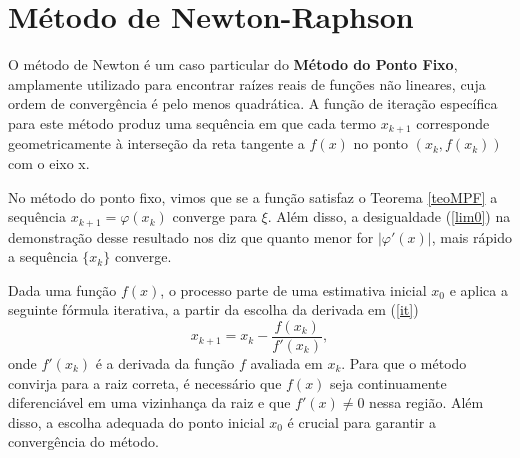 \section{Método de Newton-Raphson}




O método de Newton é um caso particular do \textbf{Método do Ponto Fixo}, amplamente utilizado para encontrar raízes reais de funções não lineares, cuja ordem de convergência é pelo menos quadrática. A função de iteração específica para este método produz uma sequência em que cada termo $x_{k+1}$ corresponde geometricamente à interseção da reta tangente a $f(x)$ no ponto $(x_k, f(x_k))$ com o eixo x. 

No método do ponto fixo, vimos que se a função satisfaz o Teorema \ref{teoMPF} a sequência $x_{k+1} = \varphi(x_k)$ converge para $\xi$. Além disso, a desigualdade (\ref{lim0}) na demonstração desse resultado nos diz que quanto menor for $|\varphi'(x)|$, mais rápido a sequência $\{x_k\}$ converge.

Dada uma função \(f(x)\), o processo parte de uma estimativa inicial \(x_0\) e aplica a seguinte fórmula iterativa, a partir da escolha da derivada em (\ref{it})
\begin{equation}
    x_{k+1} = x_k - \frac{f(x_k)}{f'(x_k)},
\end{equation}
onde \(f'(x_k)\) é a derivada da função \(f\) avaliada em \(x_k\).
Para que o método convirja para a raiz correta, é necessário que \(f(x)\) seja continuamente diferenciável em uma vizinhança da raiz e que \(f'(x) \neq 0\) nessa região. Além disso, a escolha adequada do ponto inicial \(x_0\) é crucial para garantir a convergência do método.

